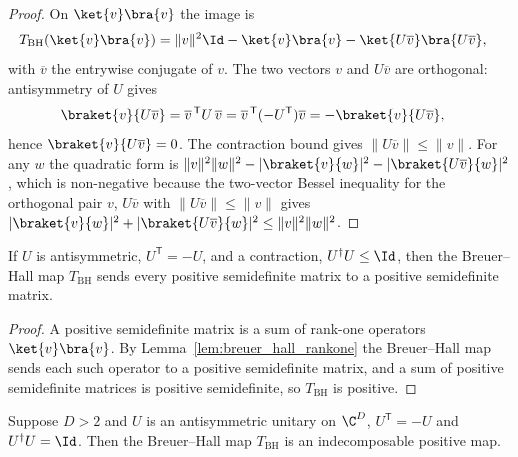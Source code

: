 \begin{proof}
    \leanok
    On $\ket{v}\bra{v}$ the image is
    \begin{align}
        T_{\mathrm{BH}}(\ket{v}\bra{v})
         & =\lVert v\rVert^{2} \Id-\ket{v}\bra{v}
        -\ket{U\overline{v}}\bra{U\overline{v}},
        \notag
    \end{align}
    with $\overline{v}$ the entrywise conjugate of $v$. The two vectors $v$ and
    $U\overline{v}$ are orthogonal: antisymmetry of $U$ gives
    \begin{align}
        \braket{v}{U\overline{v}}
         & =\overline{v}^{\,\mathsf T}U\,\overline{v}
        =\overline{v}^{\,\mathsf T}(-U^{\mathsf T})\overline{v}
        =-\braket{v}{U\overline{v}},
        \notag
    \end{align}
    hence $\braket{v}{U\overline{v}}=0$. The contraction bound gives
    $\lVert U\overline{v}\rVert\le\lVert v\rVert$. For any
    $w$ the quadratic form is
    $\lVert v\rVert^{2}\lVert w\rVert^{2}
        -\lvert\braket{v}{w}\rvert^{2}
        -\lvert\braket{U\overline{v}}{w}\rvert^{2}$,
    which is non-negative because the two-vector Bessel inequality for the
    orthogonal pair $v$, $U\overline{v}$ with
    $\lVert U\overline{v}\rVert\le\lVert v\rVert$ gives
    $\lvert\braket{v}{w}\rvert^{2} +\lvert\braket{U\overline{v}}{w}\rvert^{2}
        \le\lVert v\rVert^{2}\lVert w\rVert^{2}$.
\end{proof}

\begin{theorem}
    \label{thm:breuer_hall_positive}
    \leanok
    If $U$ is antisymmetric, $U^{\mathsf T}=-U$, and a contraction,
    $U^{\dagger}U\le\Id$, then the Breuer--Hall map $T_{\mathrm{BH}}$ sends every
    positive semidefinite matrix to a positive semidefinite matrix.
\end{theorem}

\begin{proof}
    \leanok
    A positive semidefinite matrix is a sum of rank-one operators
    $\ket{v}\bra{v}$. By Lemma~\ref{lem:breuer_hall_rankone} the Breuer--Hall map
    sends each such operator to a positive semidefinite matrix, and a sum of
    positive semidefinite matrices is positive semidefinite, so $T_{\mathrm{BH}}$
    is positive.
\end{proof}

\begin{theorem}
    \label{thm:breuer_hall_indecomposable}
    \leanok
    Suppose $D>2$ and $U$ is an antisymmetric unitary on $\C^{D}$,
    $U^{\mathsf T}=-U$ and $U^{\dagger}U=\Id$. Then the Breuer--Hall map
    $T_{\mathrm{BH}}$ is an indecomposable positive map.
\end{theorem}

